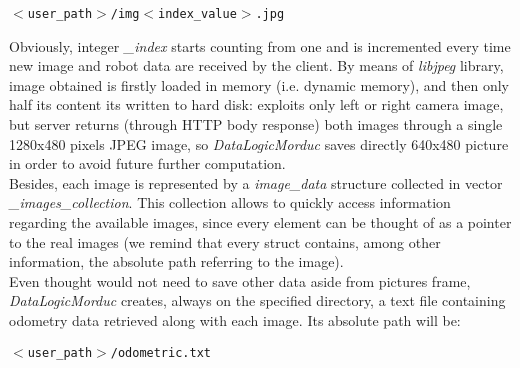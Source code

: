 \begin{center}
  \texttt{$<$user\_path$>$/img$<$index\_value$>$.jpg}
\end{center}

Obviously, integer \textit{\_index} starts counting from one and is
incremented every time new image and robot data are received by the
client. By means of \textit{libjpeg} library, image obtained is
firstly loaded in memory (i.e. dynamic memory), and then only half
its content its written to hard disk: \framework{} exploits only
left or right camera image, but server returns (through HTTP body
response) both images through a single 1280x480 pixels JPEG image,
so \textit{DataLogicMorduc} saves directly 640x480 picture in order
to avoid future further computation.
\\
Besides, each image is represented by a \textit{image\_data}
structure collected in vector \textit{\_images\_collection}. This
collection allows to quickly access information regarding the
available images, since every element can be thought of as a pointer
to the real images (we remind that every struct contains, among
other information, the absolute path referring to the image).
\\
Even thought \framework{} would not need to save other data aside
from pictures frame, \textit{DataLogicMorduc} creates, always on
the specified directory, a text file containing odometry data retrieved
along with each image. Its absolute path will be:

\begin{center}
  \texttt{$<$user\_path$>$/odometric.txt}
\end{center}

